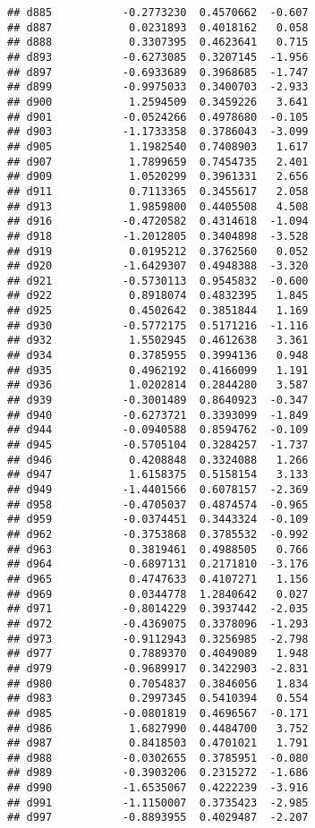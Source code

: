 \documentclass[
]{article}
\begin{document}
\begin{verbatim}
## d885           -0.2773230  0.4570662  -0.607
## d887            0.0231893  0.4018162   0.058
## d888            0.3307395  0.4623641   0.715
## d893           -0.6273085  0.3207145  -1.956
## d897           -0.6933689  0.3968685  -1.747
## d899           -0.9975033  0.3400703  -2.933
## d900            1.2594509  0.3459226   3.641
## d901           -0.0524266  0.4978680  -0.105
## d903           -1.1733358  0.3786043  -3.099
## d905            1.1982540  0.7408903   1.617
## d907            1.7899659  0.7454735   2.401
## d909            1.0520299  0.3961331   2.656
## d911            0.7113365  0.3455617   2.058
## d913            1.9859800  0.4405508   4.508
## d916           -0.4720582  0.4314618  -1.094
## d918           -1.2012805  0.3404898  -3.528
## d919            0.0195212  0.3762560   0.052
## d920           -1.6429307  0.4948388  -3.320
## d921           -0.5730113  0.9545832  -0.600
## d922            0.8918074  0.4832395   1.845
## d925            0.4502642  0.3851844   1.169
## d930           -0.5772175  0.5171216  -1.116
## d932            1.5502945  0.4612638   3.361
## d934            0.3785955  0.3994136   0.948
## d935            0.4962192  0.4166099   1.191
## d936            1.0202814  0.2844280   3.587
## d939           -0.3001489  0.8640923  -0.347
## d940           -0.6273721  0.3393099  -1.849
## d944           -0.0940588  0.8594762  -0.109
## d945           -0.5705104  0.3284257  -1.737
## d946            0.4208848  0.3324088   1.266
## d947            1.6158375  0.5158154   3.133
## d949           -1.4401566  0.6078157  -2.369
## d958           -0.4705037  0.4874574  -0.965
## d959           -0.0374451  0.3443324  -0.109
## d962           -0.3753868  0.3785532  -0.992
## d963            0.3819461  0.4988505   0.766
## d964           -0.6897131  0.2171810  -3.176
## d965            0.4747633  0.4107271   1.156
## d969            0.0344778  1.2840642   0.027
## d971           -0.8014229  0.3937442  -2.035
## d972           -0.4369075  0.3378096  -1.293
## d973           -0.9112943  0.3256985  -2.798
## d977            0.7889370  0.4049089   1.948
## d979           -0.9689917  0.3422903  -2.831
## d980            0.7054837  0.3846056   1.834
## d983            0.2997345  0.5410394   0.554
## d985           -0.0801819  0.4696567  -0.171
## d986            1.6827990  0.4484700   3.752
## d987            0.8418503  0.4701021   1.791
## d988           -0.0302655  0.3785951  -0.080
## d989           -0.3903206  0.2315272  -1.686
## d990           -1.6535067  0.4222239  -3.916
## d991           -1.1150007  0.3735423  -2.985
## d997           -0.8893955  0.4029487  -2.207

\end{verbatim}
\end{document}
